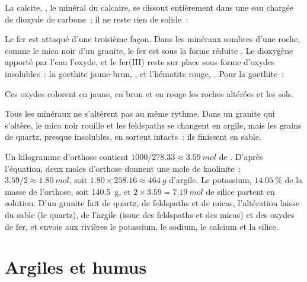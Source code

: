 \begin{proposition}\label{prop:g10:soil-formation:calcite}
La calcite, , le minéral du calcaire, se dissout entièrement dans
une eau chargée de dioxyde de carbone~; il ne reste rien de solide~:
\begin{center}
\end{center}
\end{proposition}

Le fer est attaqué d'une troisième façon. Dans les minéraux sombres d'une
roche, comme le mica noir d'un granite, le fer est sous la forme réduite
. Le dioxygène apporté par l'eau l'oxyde, et le fer(III) reste sur
place sous forme d'oxydes insolubles~: la goethite jaune-brun, ,
et l'hématite rouge, . Pour la goethite~:
\begin{center}
\end{center}
Ces oxydes colorent en jaune, en brun et en rouge les roches altérées et les
sols.

Tous les minéraux ne s'altèrent pas au même rythme. Dans un granite qui
s'altère, le mica noir rouille et les feldspaths se changent en argile, mais
les grains de quartz, presque insolubles, en sortent intacts~: ils finissent
en sable.

\begin{example}\label{ex:g10:soil-formation:granite}
Un kilogramme d'orthose contient $1000/278.33 \approx \qty{3.59}{mol}$ de
. D'après l'équation, deux moles d'orthose donnent une mole de
kaolinite~: $3.59/2 \approx \qty{1.80}{mol}$, soit $1.80 \times 258.16
\approx \qty{464}{g}$ d'argile. Le potassium, $14.05~\%$ de la masse de
l'orthose, soit \qty{140.5}{g}, et $2 \times 3.59 = \qty{7.19}{mol}$ de
silice partent en solution. D'un granite fait de quartz, de feldspaths et
de micas, l'altération laisse du sable (le quartz), de l'argile (issue des
feldspaths et des micas) et des oxydes de fer, et envoie aux rivières le
potassium, le sodium, le calcium et la silice.
\end{example}

\section{Argiles et humus}

